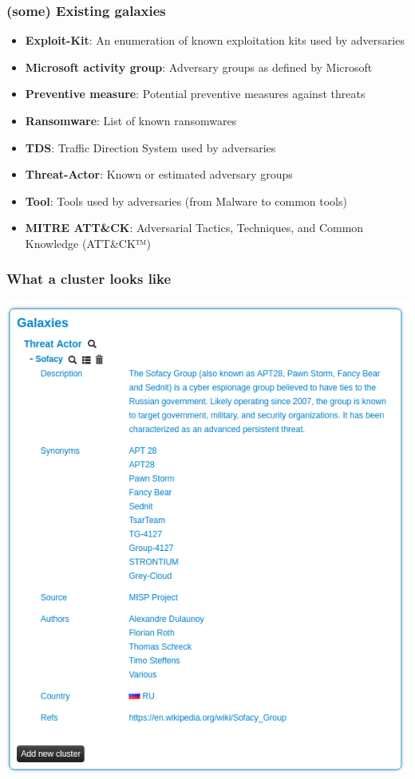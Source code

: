 \begin{frame}
     \frametitle{(some) Existing galaxies}
     \begin{itemize}
        \item {\bf Exploit-Kit}: An enumeration of known exploitation kits used by adversaries
        \item {\bf Microsoft activity group}: Adversary groups as defined by Microsoft
        \item {\bf Preventive measure}: Potential preventive measures against threats
        \item {\bf Ransomware}: List of known ransomwares
        \item {\bf TDS}: Traffic Direction System used by adversaries
        \item {\bf Threat-Actor}: Known or estimated adversary groups
        \item {\bf Tool}: Tools used by adversaries (from Malware to common tools)
	\item {\bf MITRE ATT\&CK}: Adversarial Tactics, Techniques, and Common Knowledge (ATT\&CK™)
     \end{itemize}
\end{frame}

\begin{frame}
\frametitle{What a cluster looks like}
\includegraphics[scale=0.25]{screenshots/cluster.png}
\end{frame}

